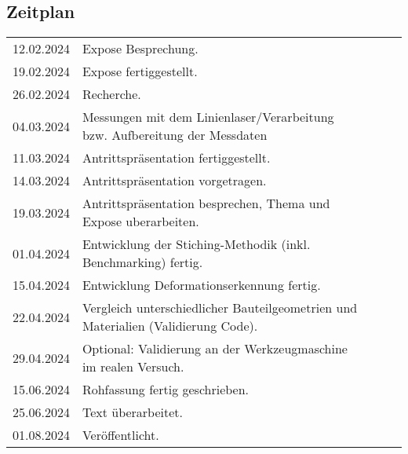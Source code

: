 \documentclass[../main.tex]{subfiles}
\begin{document}
\begin{table}[h]
    \subsection*{Zeitplan}
    \begin{tabular}{lllll}
    \multicolumn{1}{r}{12.02.2024} & Expose Besprechung.                                                          &  &  &  \\
    \multicolumn{1}{r}{19.02.2024} & Expose fertiggestellt.                                                      &  &  &  \\
    \multicolumn{1}{r}{26.02.2024} & Recherche.                               &  &  &  \\
    \multicolumn{1}{r}{04.03.2024} & Messungen mit dem Linienlaser/Verarbeitung bzw. Aufbereitung der Messdaten                          &  &  &  \\
    \multicolumn{1}{r}{11.03.2024} & Antrittspräsentation fertiggestellt.                 &  &  &  \\
    \multicolumn{1}{r}{14.03.2024} & Antrittspräsentation vorgetragen.                                                        &  &  &  \\
    \multicolumn{1}{r}{19.03.2024} & Antrittspräsentation besprechen, Thema und Expose uberarbeiten.              &  &  &  \\
    \multicolumn{1}{r}{01.04.2024} & Entwicklung der Stiching-Methodik (inkl. Benchmarking) fertig.                    &  &  &  \\
    \multicolumn{1}{r}{15.04.2024} & Entwicklung Deformationserkennung fertig. &  &  &  \\
    \multicolumn{1}{r}{22.04.2024} & Vergleich unterschiedlicher Bauteilgeometrien und Materialien (Validierung Code).&  &  &  \\
    \multicolumn{1}{r}{29.04.2024} & Optional: Validierung an der Werkzeugmaschine im realen Versuch. &  &  &  \\
    \multicolumn{1}{r}{15.06.2024} & Rohfassung fertig geschrieben.                                                        &  &  &  \\
    \multicolumn{1}{r}{25.06.2024} & Text überarbeitet.                                                           &  &  &  \\
    \multicolumn{1}{r}{01.08.2024} & Veröffentlicht.                                                            &  &  & 
    \end{tabular}
\end{table}
\end{document}
